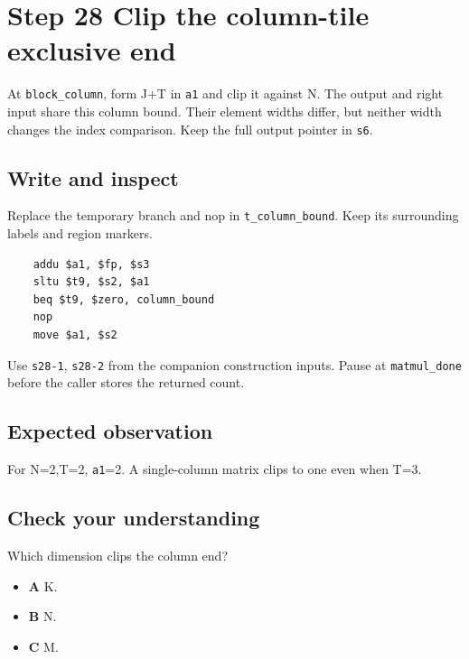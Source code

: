 \section{Step 28 Clip the column-tile exclusive end}\label{matmul-s28}

At \texttt{block\_column}, form J+T in \texttt{a1} and clip it against N. The output and right input share this column bound. Their element widths differ, but neither width changes the index comparison. Keep the full output pointer in \texttt{s6}.

\subsection{Write and inspect}
Replace the temporary branch and nop in \texttt{t\_column\_bound}. Keep its surrounding labels and region markers.

\begin{verbatim}
    addu $a1, $fp, $s3
    sltu $t9, $s2, $a1
    beq $t9, $zero, column_bound
    nop
    move $a1, $s2
\end{verbatim}
Use \texttt{s28-1}, \texttt{s28-2} from the companion construction inputs. Pause at \texttt{matmul\_done} before the caller stores the returned count.

\subsection{Expected observation}
For N=2,T=2, \texttt{a1}=2. A single-column matrix clips to one even when T=3.

\subsection{Check your understanding}
Which dimension clips the column end?

\begin{itemize}
  \item \textbf{A} K.
  \item \textbf{B} N.
  \item \textbf{C} M.
\end{itemize}
